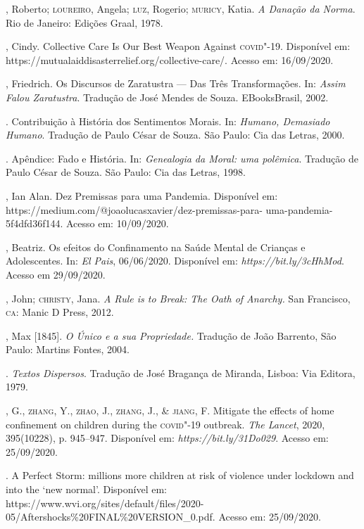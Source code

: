 \begin{bibliohedra}
, Roberto; \textsc{loureiro}, Angela; \textsc{luz}, Rogerio; \textsc{muricy}, Katia. \emph{A
Danação da Norma}. Rio de Janeiro: Edições Graal, 1978.

, Cindy. Collective Care Is Our Best Weapon Against \textsc{covid}"-19.
Disponível em: https://mutualaiddisasterrelief.org/collective-care/.
Acesso em: 16/09/2020.

, Friedrich. Os Discursos de Zaratustra --- Das Três
Transformações. In: \emph{Assim Falou Zaratustra}. Tradução de José
Mendes de Souza. EBooksBrasil, 2002.

\titidem. Contribuição à História dos Sentimentos Morais. In:
\emph{Humano, Demasiado Humano}. Tradução de Paulo César de Souza. São
Paulo: Cia das Letras, 2000.

\titidem. Apêndice: Fado e História. In: \emph{Genealogia da Moral: uma
polêmica}. Tradução de Paulo César de Souza. São Paulo: Cia das Letras,
1998.

, Ian Alan. Dez Premissas para uma Pandemia. Disponível em:
https://medium.com/@joaolucasxavier/dez-premissas-para-
uma-pandemia-5f4dfd36f144. Acesso em: 10/09/2020.

, Beatriz. Os efeitos do Confinamento na Saúde Mental de
Crianças e Adolescentes. In: \emph{El Pais}, 06/06/2020. Disponível em:
\emph{https://bit.ly/3cHhMod}. Acesso em 29/09/2020.

, John; \textsc{christy}, Jana. \emph{A Rule is to Break: The Oath of
Anarchy.} San Francisco, \textsc{ca}: Manic D Press, 2012.

, Max {[}1845{]}. \emph{O Único e a sua Propriedade.} Tradução de
João Barrento, São Paulo: Martins Fontes, 2004.

\titidem. \emph{Textos Dispersos}. Tradução de José Bragança de Miranda,
Lisboa: Via Editora, 1979.

, G., \textsc{zhang}, Y., \textsc{zhao}, J., \textsc{zhang}, J., \& \textsc{jiang}, F. Mitigate the
effects of home confinement on children during the \textsc{covid}"-19 outbreak.
\emph{The Lancet}, 2020, 395(10228), p. 945--947. Disponível em:
\emph{https://bit.ly/31Do029}.
Acesso em: 25/09/2020.

. A Perfect Storm: millions more children at risk of
violence under lockdown and into the `new normal'. Disponível em:
https://www.wvi.org/sites/default/files/2020-05/Aftershocks\%20FINAL\%20VERSION\_0.pdf.
Acesso em: 25/09/2020.
\end{bibliohedra}

